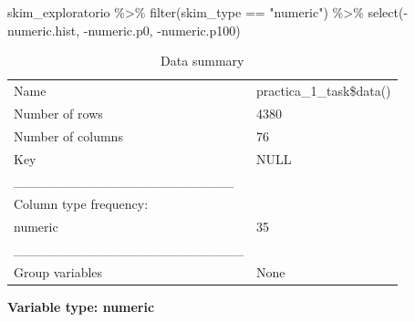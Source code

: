 \documentclass[
  11pt,
  a4paper,
]{article}
\newenvironment{Shaded}{\begin{snugshade}}{\end{snugshade}}
\newcommand{\FunctionTok}[1]{\textcolor[rgb]{0.00,0.00,0.00}{#1}}
\newcommand{\NormalTok}[1]{#1}
\newcommand{\SpecialCharTok}[1]{\textcolor[rgb]{0.00,0.00,0.00}{#1}}
\newcommand{\StringTok}[1]{\textcolor[rgb]{0.31,0.60,0.02}{#1}}
\begin{document}
\begin{Shaded}
\begin{Highlighting}[]
\NormalTok{skim\_exploratorio }\SpecialCharTok{\%\textgreater{}\%} \FunctionTok{filter}\NormalTok{(skim\_type }\SpecialCharTok{==} \StringTok{"numeric"}\NormalTok{) }\SpecialCharTok{\%\textgreater{}\%} \FunctionTok{select}\NormalTok{(}\SpecialCharTok{{-}}\NormalTok{numeric.hist, }\SpecialCharTok{{-}}\NormalTok{numeric.p0, }\SpecialCharTok{{-}}\NormalTok{numeric.p100)}
\end{Highlighting}
\end{Shaded}

\begin{longtable}[]{@{}ll@{}}
\caption{Data summary}\tabularnewline
\toprule()
\endhead
Name & practica\_1\_task\$data() \\
Number of rows & 4380 \\
Number of columns & 76 \\
Key & NULL \\
\_\_\_\_\_\_\_\_\_\_\_\_\_\_\_\_\_\_\_\_\_\_\_ & \\
Column type frequency: & \\
numeric & 35 \\
\_\_\_\_\_\_\_\_\_\_\_\_\_\_\_\_\_\_\_\_\_\_\_\_ & \\
Group variables & None \\
\bottomrule()
\end{longtable}

\textbf{Variable type: numeric}
\end{document}
